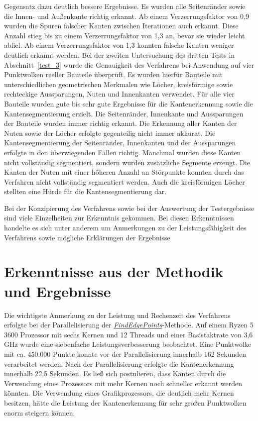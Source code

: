 Gegensatz dazu deutlich bessere Ergebnisse. Es wurden alle Seitenränder sowie die Innen- und Außenkante richtig erkannt. Ab einem Verzerrungsfaktor von 0,9 wurden die Spuren falscher Kanten zwischen Iterationen auch erkannt. Diese Anzahl stieg bis zu einem Verzerrungsfaktor von 1,3 an, bevor sie wieder leicht abfiel. Ab einem Verzerrungsfaktor von 1,3 konnten falsche Kanten weniger deutlich erkannt werden. Bei der zweiten Untersuchung des dritten Tests in Abschnitt~\ref{test_3} wurde die Genauigkeit des Verfahrens bei Anwendung auf vier Punktwolken reeller Bauteile überprüft. Es wurden hierfür Bauteile mit unterschiedlichen geometrischen Merkmalen wie Löcher, kreisförmige sowie rechteckige Aussparungen, Nuten und Innenkanten verwendet. Für alle vier Bauteile wurden gute bis sehr gute Ergebnisse für die Kantenerkennung sowie die Kantensegmentierung erzielt. Die Seitenränder, Innenkante und Aussparungen der Bauteile wurden immer richtig erkannt. Die Erkennung aller Kanten der Nuten sowie der Löcher erfolgte gegenteilig nicht immer akkurat. Die Kantensegmentierung der Seitenränder, Innenkanten und der Aussparungen erfolgte in den überwiegenden Fällen richtig. Manchmal wurden diese Kanten nicht vollständig segmentiert, sondern wurden zusätzliche Segmente erzeugt. Die Kanten der Nuten mit einer höheren Anzahl an Störpunkte konnten durch das Verfahren nicht vollständig segmentiert werden. Auch die kreisförmigen Löcher stellten eine Hürde für die Kantensegmentierung dar. 

Bei der Konzipierung des Verfahrens sowie bei der Auswertung der Testergebnisse sind viele Einzelheiten zur Erkenntnis gekommen. Bei diesen Erkenntnissen handelte es sich unter anderem um Anmerkungen zu der Leistungsfähigkeit des Verfahrens sowie mögliche Erklärungen der Ergebnisse

\section{Erkenntnisse aus der Methodik und Ergebnisse} \label{Erkenntnisse}

Die wichtigste Anmerkung zu der Leistung und Rechenzeit des Verfahrens erfolgte bei der Parallelisierung der \textit{\hyperref[alg:find_edge_points]{FindEdgePoints}}-Methode. Auf einem Ryzen 5 3600 Prozessor \autocite{noauthor_amd_2022} mit sechs Kernen und 12 Threads und einer Basistaktrate von 3,6 GHz wurde eine siebenfache Leistungsverbesserung beobachtet. Eine Punktwolke mit ca. 450.000 Punkte konnte vor der Parallelisierung innerhalb 162 Sekunden verarbeitet werden. Nach der Parallelisierung erfolgte die Kantenerkennung innerhalb 22,5 Sekunden. Es ließ sich postulieren, dass Kanten durch die Verwendung eines Prozessors mit mehr Kernen noch schneller erkannt werden könnten. Die Verwendung eines Grafikprozessors, die deutlich mehr Kernen besitzen, hätte die Leistung der Kantenerkennung für sehr großen Punktwolken enorm steigern können.

